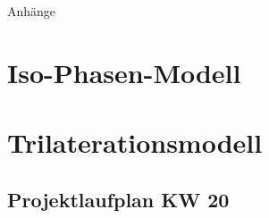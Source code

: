 %
%
%
%

\begin{appendix}
\newpage
\huge{Anhänge}
\normalsize

\section{Iso-Phasen-Modell}
\label{sec:iso_phase_modell}



\newpage
\section{Trilaterationsmodell}
\label{sec:trilateration_modell}



\begin{landscape}
	\section{Projektlaufplan KW 20}
	\label{sec:projectplan}
	\scalebox{.75}{
		
		}
\end{landscape}


\end{appendix}
